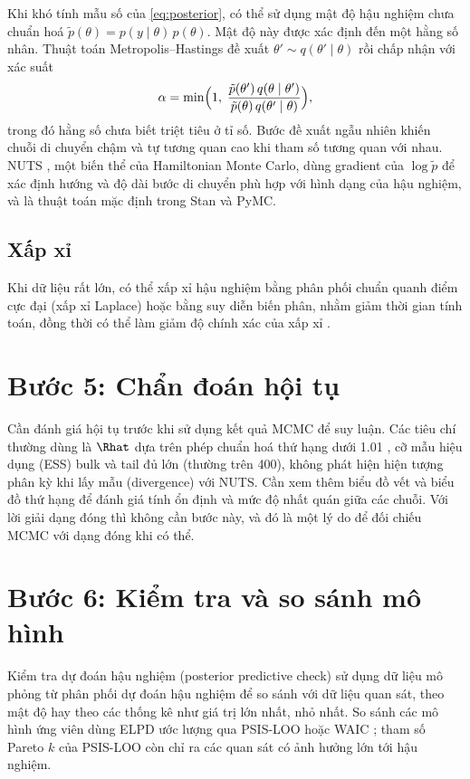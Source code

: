 \documentclass[12pt,a4paper]{report}
\begin{document}
Khi khó tính mẫu số của \eqref{eq:posterior}, có thể sử dụng mật độ hậu nghiệm
chưa chuẩn hoá $\tilde p(\theta) = p(y \mid \theta)\, p(\theta)$. Mật độ này
được xác định đến một hằng số nhân. Thuật toán Metropolis--Hastings
\cite{hastings1970} đề xuất $\theta' \sim q(\theta' \mid \theta)$ rồi chấp nhận
với xác suất
%
\begin{equation}
  \label{eq:mh}
  \alpha = \min\Bigl(1,\;
    \frac{\tilde p(\theta')\, q(\theta \mid \theta')}{\tilde p(\theta)\, q(\theta' \mid \theta)}\Bigr),
\end{equation}
%
trong đó hằng số chưa biết triệt tiêu ở tỉ số. Bước đề xuất ngẫu nhiên khiến
chuỗi di chuyển chậm và tự tương quan cao khi tham số tương quan với nhau. NUTS
\cite{hoffman2014nuts}, một biến thể của Hamiltonian Monte Carlo, dùng gradient
của $\log \tilde p$ để xác định hướng và độ dài bước di chuyển phù hợp với hình dạng của hậu nghiệm, và là
thuật toán mặc định trong Stan và PyMC.

\subsection{Xấp xỉ}

Khi dữ liệu rất lớn, có thể xấp xỉ hậu nghiệm bằng phân phối chuẩn quanh điểm cực
đại (xấp xỉ Laplace) hoặc bằng suy diễn biến phân, nhằm giảm thời gian tính toán, đồng thời có thể làm giảm độ chính xác của xấp xỉ
\cite{bishop2006prml}.

\section{Bước 5: Chẩn đoán hội tụ}

Cần đánh giá hội tụ trước khi sử dụng kết quả MCMC để suy luận. Các tiêu chí thường
dùng là $\Rhat$ dựa trên phép chuẩn hoá thứ hạng dưới \num{1.01} \cite{vehtari2021rhat}, cỡ mẫu
hiệu dụng (ESS) bulk và tail đủ lớn (thường trên 400), không phát hiện hiện tượng phân kỳ khi lấy mẫu (divergence) với NUTS.
Cần xem thêm biểu đồ vết và biểu đồ thứ hạng để đánh giá tính ổn định và mức độ
nhất quán giữa các chuỗi. Với lời giải dạng đóng thì
không cần bước này, và đó là một lý do để đối chiếu MCMC với dạng đóng khi có thể.

\section{Bước 6: Kiểm tra và so sánh mô hình}

Kiểm tra dự đoán hậu nghiệm (posterior predictive check) sử dụng dữ liệu mô phỏng từ phân phối dự đoán hậu nghiệm
để so sánh với dữ liệu quan sát, theo mật độ hay theo các thống kê như giá trị lớn nhất, nhỏ nhất. So
sánh các mô hình ứng viên dùng ELPD ước lượng qua PSIS-LOO hoặc WAIC
\cite{vehtari2017loo}; tham số Pareto $k$ của PSIS-LOO còn chỉ ra các quan sát
có ảnh hưởng lớn tới hậu nghiệm.
\end{document}
